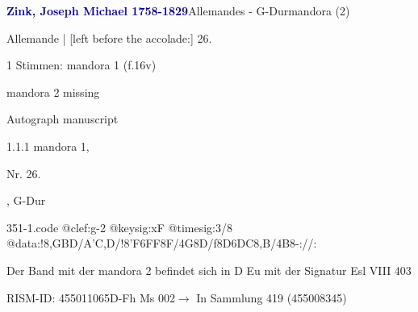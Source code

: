 \documentclass[twocolumn, 12pt]{book}
\begin{document}
\par \vspace{16pt} \textcolor{darkblue}{\textbf{Zink, Joseph Michael  1758-1829}}\hfillplus{\textbf{[351]}}\newline Allemandes - G-Dur\newline mandora (2)
\par \begin{itshape}[f.16v, at left:] Allemande | [left before the accolade:] 26.\end{itshape} 
\par \textcolor{darkblue}{}  1 Stimmen: mandora 1  (f.16v)\newline \begin{small} mandora 2 missing\end{small} \newline Autograph manuscript
\par 1.1.1  mandora 1, \begin{itshape}Nr. 26.\end{itshape}, G-Dur  
\begin{filecontents*}{351-1.code}
@clef:g-2
@keysig:xF
@timesig:3/8
@data:!8,GBD/A'C,D/!{8'F6FF8F}/4G8D/f{8D6DC8,B}/4B8-://:
\end{filecontents*}
\newline %
\par Der Band mit der mandora 2 befindet sich in D Eu mit der Signatur Esl VIII 403
\par RISM-ID: 455011065\newline D-Fh  Ms 002\newline $\rightarrow$ In Sammlung 419 (455008345)
      
\end{document}

